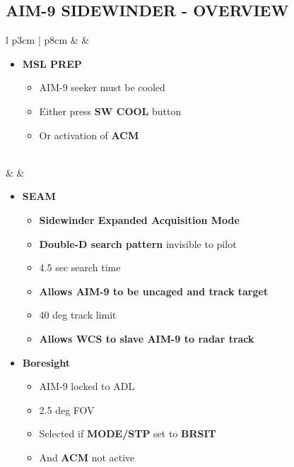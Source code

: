 \documentclass[8pt,usenames,dvipsnames,twoside]{article}
\begin{document}
	\subsection{AIM-9 SIDEWINDER - OVERVIEW}
	\begin{center}
		\begin{longtable}{l p{3cm} | p{8cm}}
			\toprule
			\textbullet &  \hfill \null {} \thumbnar &
			\begin{minipage}[t]{\linewidth}
				\vspace{-7pt}
				\begin{itemize}
					\item \textbf{MSL PREP}
					\begin{itemize}
						\item AIM-9 seeker must be cooled
						\item Either press \textbf{SW COOL} button
						\item Or activation of \textbf{ACM}
					\end{itemize}
				\end{itemize}
			\end{minipage} \\
			\midrule
			\textbullet &  &
			\begin{minipage}[t]{\linewidth}
				\vspace{-7pt}
				\begin{itemize}
					\item \textbf{SEAM}
					\begin{itemize}
						\item \textbf{Sidewinder Expanded Acquisition Mode}
						\item \textbf{Double-D search pattern} invisible to pilot
						\item 4.5 sec search time
						\item \textbf{Allows AIM-9 to be uncaged and track target}
						\item 40 deg track limit
						\item \textbf{Allows WCS to slave AIM-9 to radar track}
					\end{itemize}
					\item \textbf{Boresight}
					\begin{itemize}
						\item AIM-9 locked to ADL
						\item 2.5 deg FOV
						\item Selected if  \textbf{MODE/STP} set to \textbf{BRSIT}
						\item And \textbf{ACM} not active

\end{itemize}
\end{itemize}
\end{minipage}
\end{longtable}
\end{center}
\end{document}
